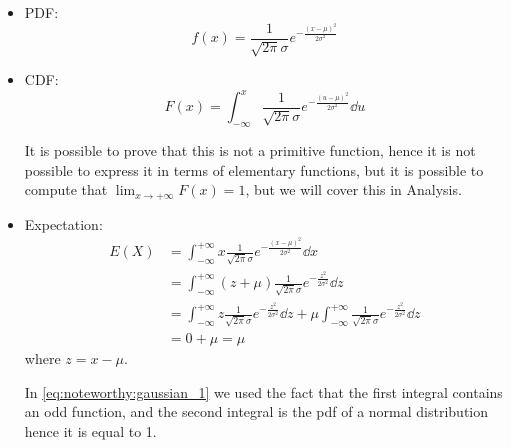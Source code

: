 \documentclass[12pt]{extarticle}
\begin{document}
\begin{itemize}
    \item PDF:
          \begin{equation}
              f(x) = \frac{1}{\sqrt{2\pi} \sigma} e^{-\frac{(x-\mu)^2}{2\sigma^2}}
          \end{equation}
    \item CDF:
          \begin{equation}
              F(x) = \int_{-\infty}^x \frac{1}{\sqrt{2\pi} \sigma} e^{-\frac{(u-\mu)^2}{2\sigma^2}} \dd{u}
          \end{equation}

          It is possible to prove that this is not a primitive function, hence it is not possible to express it in terms of elementary functions, but it is possible to compute that $\lim_{x \to +\infty} F(x) = 1$, but we will cover this in Analysis.
    \item Expectation:
          \begin{align}
              E(X) & = \int_{-\infty}^{+\infty} x \frac{1}{\sqrt{2\pi} \sigma} e^{-\frac{(x-\mu)^2}{2\sigma^2}} \dd{x}                                                                                         \\
                   & = \int_{-\infty}^{+\infty} (z + \mu) \frac{1}{\sqrt{2\pi} \sigma} e^{-\frac{z^2}{2\sigma^2}} \dd{z}                                                                                       \\
                   & = \int_{-\infty}^{+\infty} z \frac{1}{\sqrt{2\pi} \sigma} e^{-\frac{z^2}{2\sigma^2}} \dd{z} + \mu \int_{-\infty}^{+\infty} \frac{1}{\sqrt{2\pi} \sigma} e^{-\frac{z^2}{2\sigma^2}} \dd{z} \\
                   & = 0 + \mu = \mu \label{eq:noteworthy:gaussian_1}
          \end{align}
          where $z = x - \mu$.

          In \autoref{eq:noteworthy:gaussian_1} we used the fact that the first integral contains an odd function, and the second integral is the pdf of a normal distribution hence it is equal to 1.


\end{itemize}
\end{document}
